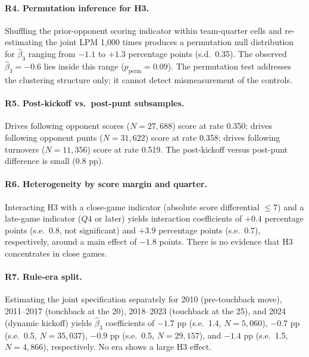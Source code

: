 \documentclass[11pt]{article}
\begin{document}
\paragraph{R4. Permutation inference for H3.} Shuffling the prior-opponent
scoring indicator within team-quarter cells and re-estimating the joint
LPM 1{,}000 times produces a permutation null distribution for
$\hat\beta_3$ ranging from $-1.1$ to $+1.3$ percentage points (s.d.\ 0.35).
The observed $\hat\beta_3 = -0.6$ lies inside this range
($p_{\text{perm}} = 0.09$). The permutation test addresses the clustering
structure only; it cannot detect mismeasurement of the controls.

\paragraph{R5. Post-kickoff vs.\ post-punt subsamples.} Drives following
opponent scores ($N = 27{,}688$) score at rate 0.350; drives following
opponent punts ($N = 31{,}622$) score at rate 0.358; drives following
turnovers ($N = 11{,}356$) score at rate 0.519. The post-kickoff versus
post-punt difference is small (0.8 pp).

\paragraph{R6. Heterogeneity by score margin and quarter.} Interacting H3
with a close-game indicator (absolute score differential $\leq 7$) and a
late-game indicator ($Q4$ or later) yields interaction coefficients
of $+0.4$ percentage points (s.e.\ 0.8, not significant) and $+3.9$
percentage points (s.e.\ 0.7), respectively, around a main effect of
$-1.8$ points. There is no evidence that H3 concentrates in close games.

\paragraph{R7. Rule-era split.} Estimating the joint specification
separately for 2010 (pre-touchback move), 2011--2017 (touchback at the 20),
2018--2023 (touchback at the 25), and 2024 (dynamic kickoff) yields
$\hat\beta_3$ coefficients of $-1.7$ pp (s.e.\ 1.4, $N=5{,}060$),
$-0.7$ pp (s.e.\ 0.5, $N=35{,}037$), $-0.9$ pp (s.e.\ 0.5,
$N=29{,}157$), and $-1.4$ pp (s.e.\ 1.5, $N=4{,}866$), respectively.
No era shows a large H3 effect.
\end{document}
